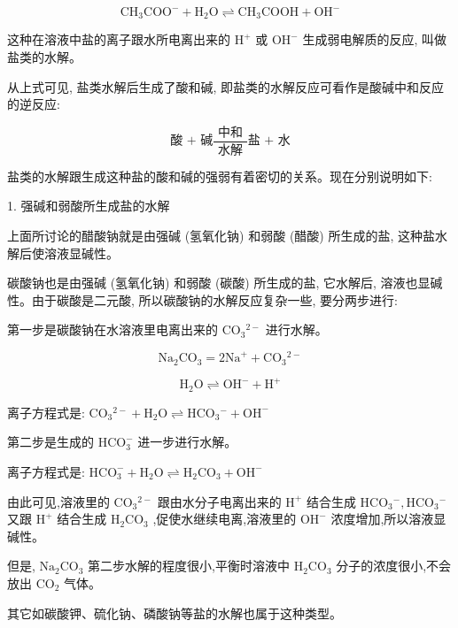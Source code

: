 \documentclass[10pt]{article}
\begin{document}
\[
{\mathrm{{CH}}}_{3}{\mathrm{{COO}}}^{ - } + {\mathrm{H}}_{2}\mathrm{O} \rightleftharpoons {\mathrm{{CH}}}_{3}\mathrm{{COOH}} + {\mathrm{{OH}}}^{ - }
\]

这种在溶液中盐的离子跟水所电离出来的 \({\mathrm{H}}^{ + }\) 或 \({\mathrm{{OH}}}^{ - }\) 生成弱电解质的反应, 叫做盐类的水解。

从上式可见, 盐类水解后生成了酸和碱, 即盐类的水解反应可看作是酸碱中和反应的逆反应:

\[
\text{酸 + 碱}\frac{\text{ 中和 }}{\text{ 水解 }}\text{盐 + 水}
\]

盐类的水解跟生成这种盐的酸和碱的强弱有着密切的关系。现在分别说明如下:

1. 强碱和弱酸所生成盐的水解

上面所讨论的醋酸钠就是由强碱 (氢氧化钠) 和弱酸 (醋酸) 所生成的盐, 这种盐水解后使溶液显碱性。

碳酸钠也是由强碱 (氢氧化钠) 和弱酸 (碳酸) 所生成的盐, 它水解后, 溶液也显碱性。由于碳酸是二元酸, 所以碳酸钠的水解反应复杂一些, 要分两步进行:

第一步是碳酸钠在水溶液里电离出来的 \({\mathrm{{CO}}}_{3}{}^{2 - }\) 进行水解。

\[
{\mathrm{{Na}}}_{2}{\mathrm{{CO}}}_{3} = 2{\mathrm{{Na}}}^{ + } + {\mathrm{{CO}}}_{3}{}^{2 - }
\]

\[
{\mathrm{H}}_{2}\mathrm{O} \rightleftharpoons {\mathrm{{OH}}}^{ - } + {\mathrm{H}}^{ + }
\]

离子方程式是: \({\mathrm{{CO}}}_{3}{}^{2 - } + {\mathrm{H}}_{2}\mathrm{O} \rightleftharpoons {\mathrm{{HCO}}}_{3}{}^{ - } + {\mathrm{{OH}}}^{ - }\)

第二步是生成的 \({\mathrm{{HCO}}}_{3}^{ - }\) 进一步进行水解。

离子方程式是: \({\mathrm{{HCO}}}_{3}^{ - } + {\mathrm{H}}_{2}\mathrm{O} \rightleftharpoons {\mathrm{H}}_{2}{\mathrm{{CO}}}_{3} + {\mathrm{{OH}}}^{ - }\)

由此可见,溶液里的 \({\mathrm{{CO}}}_{3}{}^{2 - }\) 跟由水分子电离出来的 \({\mathrm{H}}^{ + }\) 结合生成 \({\mathrm{{HCO}}}_{3}{}^{ - },{\mathrm{{HCO}}}_{3}{}^{ - }\) 又跟 \({\mathrm{H}}^{ + }\) 结合生成 \({\mathrm{H}}_{2}{\mathrm{{CO}}}_{3}\) ,促使水继续电离,溶液里的 \({\mathrm{{OH}}}^{ - }\) 浓度增加,所以溶液显碱性。

但是, \({\mathrm{{Na}}}_{2}{\mathrm{{CO}}}_{3}\) 第二步水解的程度很小,平衡时溶液中 \({\mathrm{H}}_{2}{\mathrm{{CO}}}_{3}\) 分子的浓度很小,不会放出 \({\mathrm{{CO}}}_{2}\) 气体。

其它如碳酸钾、硫化钠、磷酸钠等盐的水解也属于这种类型。
\end{document}
